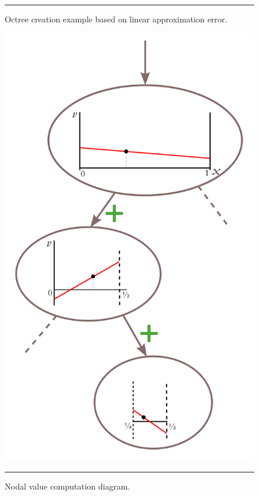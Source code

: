 \begin{figure}[!tbp]
\begin{minipage}[b]{0.4\textwidth}
    \rule{\textwidth}{.4pt}
    \captionsetup{width=\linewidth}
    \caption[Octree creation.]{Octree creation example based on linear approximation error.}
    \label{fig:octree-creation}
  \end{minipage}
  \hfill
  \begin{minipage}[b]{0.4\textwidth}
    \includegraphics[width=\textwidth]{figures/chapter-approximation/figure6}
    \rule{\textwidth}{.4pt}
    \captionsetup{width=\linewidth}
    \caption[Nodal value computation.]{Nodal value computation diagram.}
    \label{fig:nodal-value-computation}
  \end{minipage}
\end{figure}

